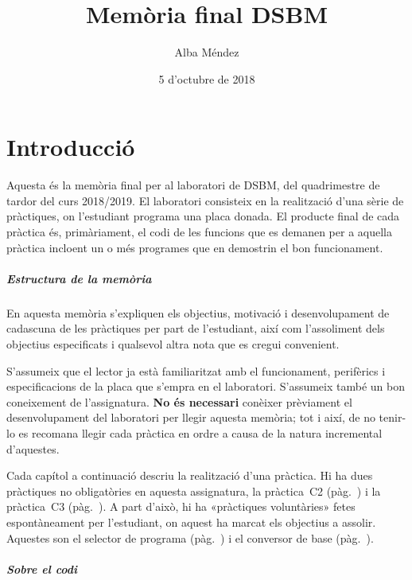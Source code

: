 \documentclass[catalan,parskip=half*,oneside,DIV=11,hidelinks]{scrreprt}
\let\myTOC\tableofcontents
\renewcommand\tableofcontents{%
  \pdfbookmark[1]{\contentsname}{}
  \myTOC }
\begin{document}
\title{Memòria final DSBM}
\date{5 d'octubre de 2018}
\author{Alba Méndez}

\maketitle

\tableofcontents
\clearpage


\chapter{Introducció}

Aquesta és la memòria final per al laboratori de DSBM, del quadrimestre de tardor del curs 2018/2019.
El laboratori consisteix en la realització d'una sèrie de pràctiques, on l'estudiant programa una
placa donada. El producte final de cada pràctica és, primàriament, el codi de les funcions que es
demanen per a aquella pràctica incloent un o més programes que en demostrin el bon funcionament.

\paragraph{Estructura de la memòria}

En aquesta memòria s'expliquen els objectius, motivació i desenvolupament de cadascuna de les
pràctiques per part de l'estudiant, així com l'assoliment dels objectius especificats i qualsevol
altra nota que es cregui convenient.

S'assumeix que el lector ja està familiaritzat amb el funcionament, perifèrics i especificacions
de la placa que s'empra en el laboratori. S'assumeix també un bon coneixement de l'assignatura.
\textbf{No és necessari} conèixer prèviament el desenvolupament del laboratori per llegir aquesta
memòria; tot i així, de no tenir-lo es recomana llegir cada pràctica en ordre a causa de la natura
incremental d'aquestes.

Cada capítol a continuació descriu la realització d'una pràctica. Hi ha dues pràctiques no
obligatòries en aquesta assignatura, la pràctica~C2 (pàg.~\pageref{ch:c2}) i la pràctica~C3
(pàg.~\pageref{ch:c3}). A part d'això, hi ha «pràctiques voluntàries» fetes espontàneament per
l'estudiant, on aquest ha marcat els objectius a assolir. Aquestes son el selector de programa
(pàg.~\pageref{ch:selector}) i el conversor de base (pàg.~\pageref{ch:basecvt}).

\paragraph{Sobre el codi}
\end{document}
